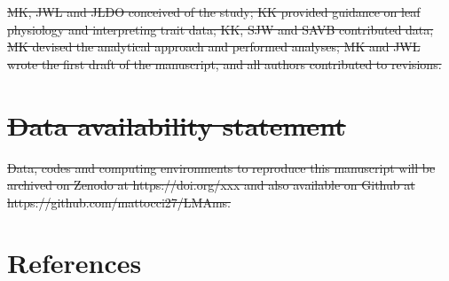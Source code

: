 \documentclass[
  12pt,
  letterpaper,
  DIV=11,
  numbers=noendperiod]{scrartcl}
\providecommand{\DIFdel}[1]{{\protect\color{red}\sout{#1}}}                      %
\providecommand{\DIFdelend}{} %
\DeclareRobustCommand{\DIFdelend}{\DIFOaddend \let\includegraphics\DIFOincludegraphics} %
\begin{document}
\DIFdel{MK, JWL and JLDO conceived of the study; KK provided guidance on leaf
physiology and interpreting trait data; KK, SJW and SAVB contributed
data; MK devised the analytical approach and performed analyses; MK and
JWL wrote the first draft of the manuscript, and all authors contributed
to revisions.
}%

\section{\DIFdel{Data availability statement}}%
\addtocounter{section}{-1}%

\DIFdel{Data, codes and computing environments to reproduce this manuscript will
be archived on Zenodo at https://doi.org/xxx and also available on
Github at https://github.com/mattocci27/LMAms.
}%

\DIFdelend \section{References}\label{references}
\end{document}
